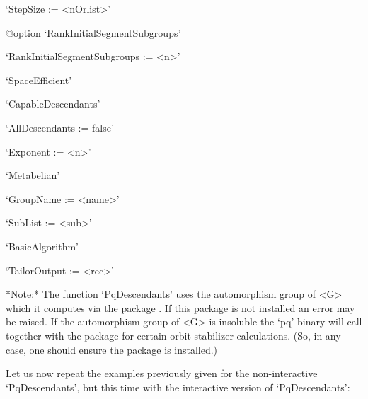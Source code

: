 \item{}`StepSize := <nOrlist>'

%
{@option \noexpand`RankInitialSegmentSubgroups'}
\item{}`RankInitialSegmentSubgroups := <n>'

\item{}`SpaceEfficient'

\item{}`CapableDescendants'

\item{}`AllDescendants := false'

\item{}`Exponent := <n>'

\item{}`Metabelian'

\item{}`GroupName := <name>'

\item{}`SubList := <sub>'

\item{}`BasicAlgorithm'

\item{}`TailorOutput := <rec>'

\endlist

*Note:*
The function `PqDescendants' uses the automorphism group of <G> which  it
computes via the package {\AutPGrp}. If this package is not installed  an
error may be raised. If the automorphism group of <G>  is  insoluble  the
`pq' binary will call {\GAP} together with  the  {\AutPGrp}  package  for
certain orbit-stabilizer calculations.  (So,  in  any  case,  one  should
ensure the {\AutPGrp} package is installed.)

Let us now repeat the examples previously given for  the  non-interactive
`PqDescendants',  but  this  time  with  the   interactive   version   of
`PqDescendants':

